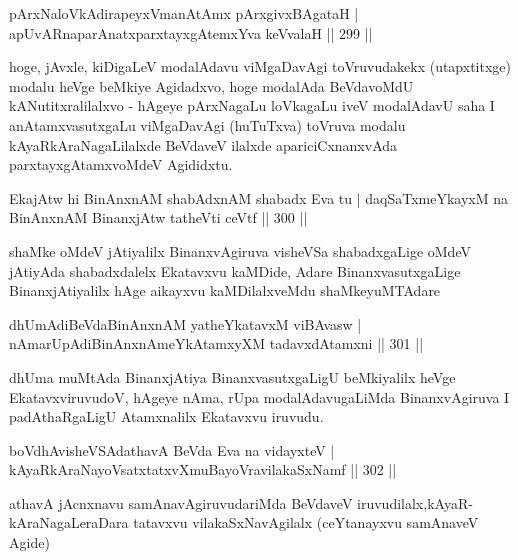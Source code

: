 \begin{shl}
pArxNaloVkAdirapeyxVmanAtAmx pArxgivxBAgataH |
apUvARnaparAnatxparxtayxgAtemxYva keVvalaH \hfill || 299 ||
\end{shl}

\begin{artha}
hoge, jAvxle, kiDigaLeV modalAdavu viMgaDavAgi toVruvudakekx (utapxtitxge) modalu heVge beMkiye Agidadxvo, hoge modalAda BeVdavoMdU kANutitxralilalxvo - hAgeye pArxNagaLu loVkagaLu iveV modalAdavU saha I anAtamxvasutxgaLu viMgaDavAgi (huTuTxva) toVruva modalu kAyaRkAraNagaLilalxde BeVdaveV ilalxde apariciCxnanxvAda parxtayxgAtamxvoMdeV Agididxtu.
\end{artha}

\begin{shl}
EkajAtw hi BinAnxnAM shabAdxnAM shabadx Eva tu |
daqSaTxmeYkayxM na BinAnxnAM BinanxjAtw tatheVti ceVtf \hfill || 300 ||
\end{shl}

\begin{artha}
shaMke \mdash oMdeV jAtiyalilx BinanxvAgiruva visheVSa shabadxgaLige oMdeV jAtiyAda shabadxdalelx Ekatavxvu kaMDide, Adare BinanxvasutxgaLige BinanxjAtiyalilx hAge aikayxvu kaMDilalxveMdu shaMkeyuMTAdare \mdash 
\end{artha}


\begin{shl}
dhUmAdiBeVdaBinAnxnAM yatheYkatavxM viBAvasw |
nAmarUpAdiBinAnxnAmeYkAtamxyXM tadavxdAtamxni \hfill || 301 ||
\end{shl}

\begin{artha}
dhUma muMtAda BinanxjAtiya BinanxvasutxgaLigU beMkiyalilx heVge EkatavxviruvudoV, hAgeye nAma, rUpa modalAdavugaLiMda BinanxvAgiruva I padAthaRgaLigU Atamxnalilx Ekatavxvu iruvudu.
\end{artha}


	\begin{shl}
boVdhAvisheVSAdathavA BeVda Eva na vidayxteV |
kAyaRkAraNayoVsatxtatxvXmuBayoVravilakaSxNamf \hfill || 302 ||
\end{shl}

\begin{artha}
athavA jAcnxnavu samAnavAgiruvudariMda BeVdaveV iruvudilalx,\break kAyaR-kAraNagaLeraDara tatavxvu vilakaSxNavAgilalx (ceYtanayxvu samAnaveV Agide)
\end{artha}

